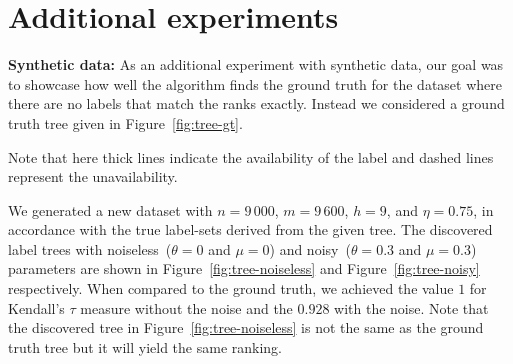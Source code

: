 \section{Additional experiments}


\textbf{Synthetic data:}
As an additional experiment with synthetic data, our goal was to showcase how well 
the algorithm finds the ground truth for the dataset where there are no labels
that match the ranks exactly. Instead we considered a ground truth tree
given in Figure~\ref{fig:tree-gt}. 

Note that here
thick lines indicate the availability of the label and
dashed lines represent the unavailability.

We generated a new dataset with $n =
9\,000$, $m = 9\,600$, $h = 9$, and $\eta = 0.75$, in accordance with the true
label-sets derived from the given tree.  The discovered label trees with
noiseless~($\theta = 0$ and  $\mu = 0$)
and
noisy~($\theta = 0.3$ and  $\mu = 0.3$)
parameters are shown in Figure~\ref{fig:tree-noiseless} and
Figure~\ref{fig:tree-noisy} respectively.
When compared to the ground truth,
we achieved the value $1$ for
Kendall's $\tau$ measure without the noise and the
$0.928$ with the noise. Note that the
discovered tree in Figure~\ref{fig:tree-noiseless} is not the same as the ground truth tree
but it will yield the same ranking.



